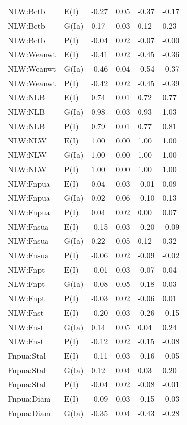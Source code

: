 \begin{center}
\begin{longtable}{|p{1.1in}|p{0.7in}|p{0.7in}|p{0.6in}|p{0.6in}|p{0.6in}|}
  NLW:Bctb & E(I) & -0.27 & 0.05 & -0.37 & -0.17 \\ 
  NLW:Bctb & G(Ia) & 0.17 & 0.03 & 0.12 & 0.23 \\ 
  NLW:Bctb & P(I) & -0.04 & 0.02 & -0.07 & -0.00 \\ 
  NLW:Weanwt & E(I) & -0.41 & 0.02 & -0.45 & -0.36 \\ 
  NLW:Weanwt & G(Ia) & -0.46 & 0.04 & -0.54 & -0.37 \\ 
  NLW:Weanwt & P(I) & -0.42 & 0.02 & -0.45 & -0.39 \\ 
  NLW:NLB & E(I) & 0.74 & 0.01 & 0.72 & 0.77 \\ 
  NLW:NLB & G(Ia) & 0.98 & 0.03 & 0.93 & 1.03 \\ 
  NLW:NLB & P(I) & 0.79 & 0.01 & 0.77 & 0.81 \\ 
  NLW:NLW & E(I) & 1.00 & 0.00 & 1.00 & 1.00 \\ 
  NLW:NLW & G(Ia) & 1.00 & 0.00 & 1.00 & 1.00 \\ 
  NLW:NLW & P(I) & 1.00 & 0.00 & 1.00 & 1.00 \\ 
  NLW:Fnpua & E(I) & 0.04 & 0.03 & -0.01 & 0.09 \\ 
  NLW:Fnpua & G(Ia) & 0.02 & 0.06 & -0.10 & 0.13 \\ 
  NLW:Fnpua & P(I) & 0.04 & 0.02 & 0.00 & 0.07 \\ 
  NLW:Fnsua & E(I) & -0.15 & 0.03 & -0.20 & -0.09 \\ 
  NLW:Fnsua & G(Ia) & 0.22 & 0.05 & 0.12 & 0.32 \\ 
  NLW:Fnsua & P(I) & -0.06 & 0.02 & -0.09 & -0.02 \\ 
  NLW:Fnpt & E(I) & -0.01 & 0.03 & -0.07 & 0.04 \\ 
  NLW:Fnpt & G(Ia) & -0.08 & 0.05 & -0.18 & 0.03 \\ 
  NLW:Fnpt & P(I) & -0.03 & 0.02 & -0.06 & 0.01 \\ 
  NLW:Fnst & E(I) & -0.20 & 0.03 & -0.26 & -0.15 \\ 
  NLW:Fnst & G(Ia) & 0.14 & 0.05 & 0.04 & 0.24 \\ 
  NLW:Fnst & P(I) & -0.12 & 0.02 & -0.15 & -0.08 \\ 
  Fnpua:Stal & E(I) & -0.11 & 0.03 & -0.16 & -0.05 \\ 
  Fnpua:Stal & G(Ia) & 0.12 & 0.04 & 0.03 & 0.20 \\ 
  Fnpua:Stal & P(I) & -0.04 & 0.02 & -0.08 & -0.01 \\ 
  Fnpua:Diam & E(I) & -0.09 & 0.03 & -0.15 & -0.03 \\ 
  Fnpua:Diam & G(Ia) & -0.35 & 0.04 & -0.43 & -0.28 \\ 

\end{longtable}
\end{center}
